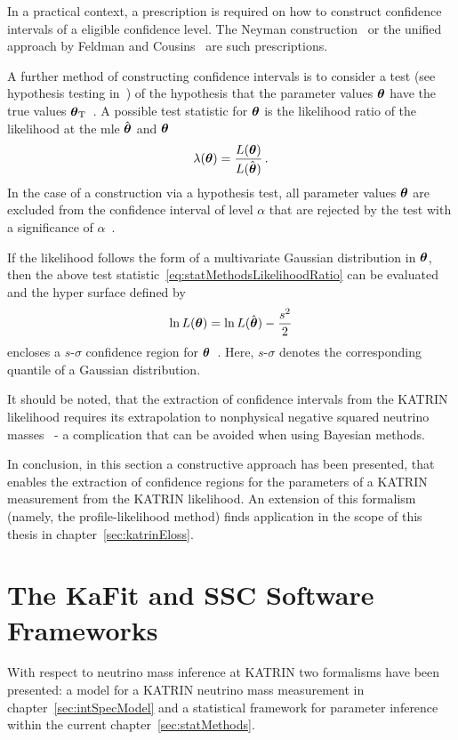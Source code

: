 In a practical context, a prescription is required on how to construct confidence intervals of a eligible confidence level. The Neyman construction~\cite{Neyman1937} or the unified approach by Feldman and Cousins~\cite{Feldman1998} are such prescriptions.

A further method of constructing confidence intervals is to consider a test (see hypothesis testing in~\cite{ReviewOfParticlePhysics}) of the hypothesis that the parameter values $\boldsymbol{\mathbf{\theta}}$ have the true values $\boldsymbol{\mathbf{\theta}}_\mathrm{T}$~\cite{ReviewOfParticlePhysics}. A possible test statistic for $\boldsymbol{\mathbf{\theta}}$ is the likelihood ratio of the likelihood at the \gls{mle} $\hat{\boldsymbol{\mathbf{\theta}}}$ and $\boldsymbol{\mathbf{\theta}}$~\cite{ReviewOfParticlePhysics}
\begin{equation}
	\label{eq:statMethodsLikelihoodRatio}
	\lambda(\boldsymbol{\mathbf{\theta}}) =
	\frac{L(\boldsymbol{\mathbf{\theta}})}{L(\hat{\boldsymbol{\mathbf{\theta}}})}
	\text{\,.}
\end{equation}
In the case of a construction via a hypothesis test, all parameter values $\boldsymbol{\mathbf{\theta}}$ are excluded from the confidence interval of level $\alpha$ that are rejected by the test with a significance of $\alpha$~\cite{ReviewOfParticlePhysics}.

If the likelihood follows the form of a multivariate Gaussian distribution in $\boldsymbol{\mathbf{\theta}}$, then the above test statistic~\eqref{eq:statMethodsLikelihoodRatio} can be evaluated and the hyper surface defined by
\begin{equation}
	\label{eq:statMethodsConfidenceContour}
	\ln L(\boldsymbol{\mathbf{\theta}}) = 	\ln L(\hat{\boldsymbol{\mathbf{\theta}}}) - \frac{s^2}{2}
\end{equation}
encloses a $s$-$\sigma$ confidence region for $\boldsymbol{\mathbf{\theta}}$~\cite{ReviewOfParticlePhysics}. Here, $s$-$\sigma$ denotes the corresponding quantile of a Gaussian distribution.

It should be noted, that the extraction of confidence intervals from the KATRIN likelihood requires its extrapolation to nonphysical negative squared neutrino masses~\cite{Kleesiek2014} - a complication that can be avoided when using Bayesian methods.

In conclusion, in this section a constructive approach has been presented, that enables the extraction of confidence regions for the parameters of a KATRIN measurement from the KATRIN likelihood. An extension of this formalism (namely, the profile-likelihood method) finds application in the scope of this thesis in chapter~\ref{sec:katrinEloss}.

\section{The KaFit and SSC Software Frameworks}
\label{sec:statMethodsKaFitSSC}
With respect to neutrino mass inference at KATRIN two formalisms have been presented: a model for a KATRIN neutrino mass measurement in chapter~\ref{sec:intSpecModel} and a statistical framework for parameter inference within the current chapter~\ref{sec:statMethods}.

